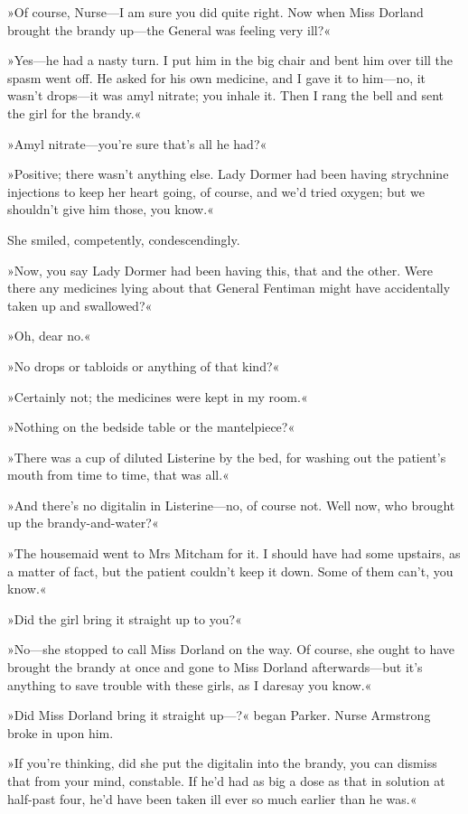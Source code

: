 »Of course, Nurse—I am sure you did quite right. Now when Miss Dorland brought the brandy up—the General was feeling very ill?«

»Yes—he had a nasty turn. I put him in the big chair and bent him over till the spasm went off. He asked for his own medicine, and I gave it to him—no, it wasn't drops—it was amyl nitrate; you inhale it. Then I rang the bell and sent the girl for the brandy.«

»Amyl nitrate—you're sure that's all he had?«

»Positive; there wasn't anything else. Lady Dormer had been having strychnine injections to keep her heart going, of course, and we'd tried oxygen; but we shouldn't give him those, you know.«

She smiled, competently, condescendingly.

»Now, you say Lady Dormer had been having this, that and the other. Were there any medicines lying about that General Fentiman might have accidentally taken up and swallowed?«

»Oh, dear no.«

»No drops or tabloids or anything of that kind?«

»Certainly not; the medicines were kept in my room.«

»Nothing on the bedside table or the mantelpiece?«

»There was a cup of diluted Listerine by the bed, for washing out the patient's mouth from time to time, that was all.«

»And there's no digitalin in Listerine—no, of course not. Well now, who brought up the brandy-and-water?«

»The housemaid went to Mrs Mitcham for it. I should have had some upstairs, as a matter of fact, but the patient couldn't keep it down. Some of them can't, you know.«

»Did the girl bring it straight up to you?«

»No—she stopped to call Miss Dorland on the way. Of course, she ought to have brought the brandy at once and gone to Miss Dorland afterwards—but it's anything to save trouble with these girls, as I daresay you know.«

»Did Miss Dorland bring it straight up—?« began Parker. Nurse Armstrong broke in upon him.

»If you're thinking, did she put the digitalin into the brandy, you can dismiss that from your mind, constable. If he'd had as big a dose as that in solution at half-past four, he'd have been taken ill ever so much earlier than he was.«

